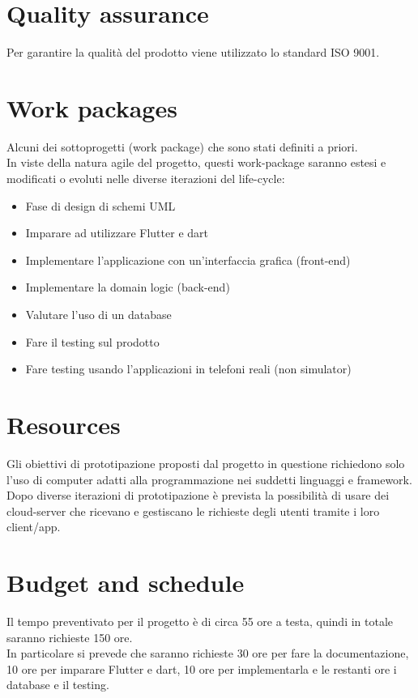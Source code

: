\documentclass{article}
\begin{document}
\section{Quality assurance}
Per garantire la qualità del prodotto viene utilizzato lo standard ISO 9001.

\section{Work packages}
Alcuni dei sottoprogetti (work package) che sono stati definiti a priori.
\\ In viste della natura agile del progetto, questi work-package saranno estesi e modificati o evoluti nelle diverse iterazioni del life-cycle:
\begin{itemize}
    \item Fase di design di schemi UML
    \item Imparare ad utilizzare Flutter e dart
    \item Implementare l'applicazione con un'interfaccia grafica (front-end)
    \item Implementare la domain logic (back-end)
    \item Valutare l'uso di un database
    \item Fare il testing sul prodotto
    \item Fare testing usando l'applicazioni in telefoni reali (non simulator)
\end{itemize}

\section{Resources}
Gli obiettivi di prototipazione proposti dal progetto in questione richiedono solo l'uso di computer adatti alla programmazione nei suddetti linguaggi e framework.
Dopo diverse iterazioni di prototipazione è prevista la possibilità di usare dei cloud-server che ricevano e gestiscano le richieste degli utenti tramite i loro client/app. 

\section{Budget and schedule}
Il tempo preventivato per il progetto è di circa 55 ore a testa, quindi in totale saranno richieste 150 ore.
\\In particolare si prevede che saranno richieste 30 ore per fare la documentazione, 10 ore per imparare Flutter e dart, 10 ore per implementarla
e le restanti ore i database e il testing.
\end{document}
